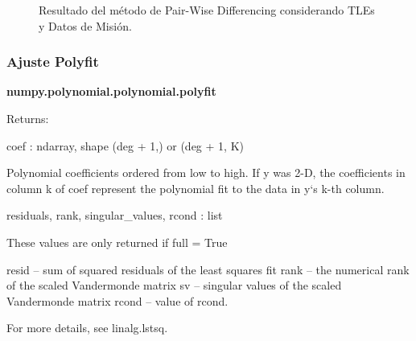 \begin{figure}[htbp]
 \centering
 \caption{Resultado del m\'etodo de Pair-Wise Differencing considerando TLEs y Datos de Misi\'on.}
 \label{fig:test}
\end{figure}

\subsubsection{Ajuste Polyfit}

{\bf{numpy.polynomial.polynomial.polyfit}}

Returns:	

coef : ndarray, shape (deg + 1,) or (deg + 1, K)

    Polynomial coefficients ordered from low to high. If y was 2-D, the coefficients in column k of coef represent the polynomial fit to the data in y‘s k-th column.

residuals, rank, singular\_values, rcond : list

    These values are only returned if full = True

    resid – sum of squared residuals of the least squares fit rank – the numerical rank of the scaled Vandermonde matrix sv – singular values of the scaled Vandermonde matrix rcond – value of rcond.

    For more details, see linalg.lstsq.

